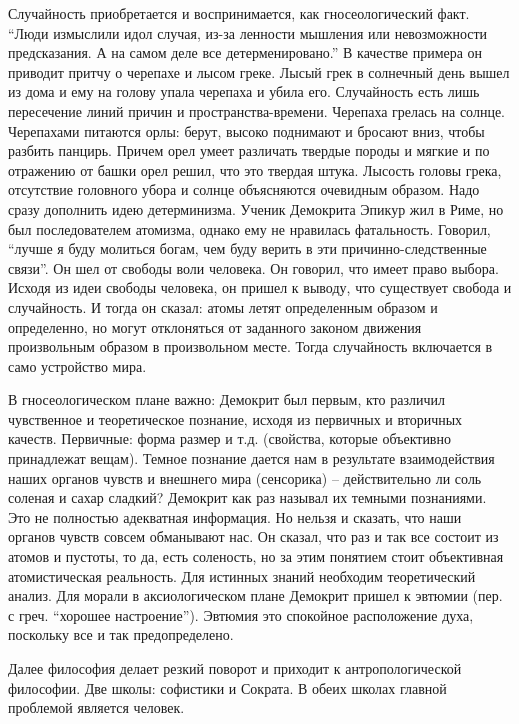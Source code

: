 \documentclass[a4paper, 12pt]{article}
\begin{document}
Случайность приобретается и воспринимается, как гносеологический факт. ``Люди измыслили идол случая, из-за ленности мышления или невозможности предсказания. А на самом деле все детерменировано.'' В качестве примера он приводит притчу о черепахе и лысом греке. Лысый грек в солнечный день вышел из дома и ему на голову упала черепаха и убила его. Случайность есть лишь пересечение линий причин и пространства-времени. Черепаха грелась на солнце. Черепахами питаются орлы: берут, высоко поднимают и бросают вниз, чтобы разбить панцирь. Причем орел умеет различать твердые породы и мягкие и по отражению от башки орел решил, что это твердая штука. Лысость головы грека, отсутствие головного убора и солнце объясняются очевидным образом. Надо сразу дополнить идею детерминизма. Ученик Демокрита Эпикур жил в Риме, но был последователем атомизма, однако ему не нравилась фатальность. Говорил, ``лучше я буду молиться богам, чем буду верить в эти причинно-следственные связи''. Он шел от свободы воли человека. Он говорил, что имеет право выбора. Исходя из идеи свободы человека, он пришел к выводу, что существует свобода и случайность. И тогда он сказал: атомы летят определенным образом и определенно, но могут отклоняться от заданного законом движения произвольным образом в произвольном месте. Тогда случайность включается в само устройство мира. 

В гносеологическом плане важно: Демокрит был первым, кто различил чувственное и теоретическое познание, исходя из первичных и вторичных качеств. Первичные: форма размер и т.д. (свойства, которые объективно принадлежат вещам). Темное познание дается нам в результате взаимодействия наших органов чувств и внешнего мира (сенсорика) -- действительно ли соль соленая и сахар сладкий? Демокрит как раз называл их темными познаниями. Это не полностью адекватная информация. Но нельзя и сказать, что наши органов чувств совсем обманывают нас. Он сказал, что раз и так все состоит из атомов и пустоты, то да, есть соленость, но за этим понятием стоит объективная атомистическая реальность. Для истинных знаний необходим теоретический анализ. Для морали в аксиологическом плане Демокрит пришел к эвтюмии (пер. с греч. ``хорошее настроение''). Эвтюмия это спокойное расположение духа, поскольку все и так предопределено. 

Далее философия делает резкий поворот и приходит к антропологической философии. Две школы: софистики и Сократа. В обеих школах главной проблемой является человек. 
\end{document}
